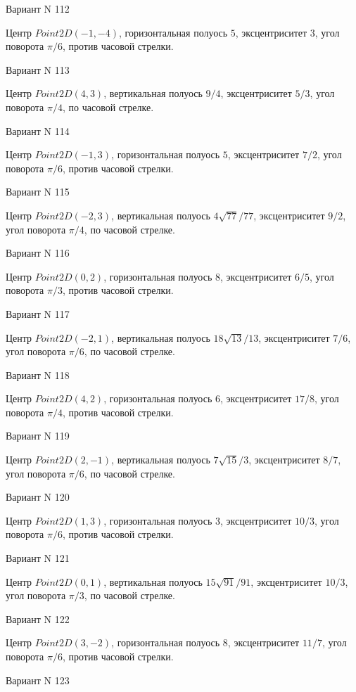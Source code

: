 \documentclass[11pt]{report}
\begin{document}
Вариант N 112

Центр $Point2D\left(-1, -4\right)$, горизонтальная полуось $5$, эксцентриситет $3$, угол поворота $\pi / 6$, против часовой стрелки.

Вариант N 113

Центр $Point2D\left(4, 3\right)$, вертикальная полуось $9 / 4$, эксцентриситет $5 / 3$, угол поворота $\pi / 4$, по часовой стрелке.

Вариант N 114

Центр $Point2D\left(-1, 3\right)$, горизонтальная полуось $5$, эксцентриситет $7 / 2$, угол поворота $\pi / 6$, против часовой стрелки.

Вариант N 115

Центр $Point2D\left(-2, 3\right)$, вертикальная полуось $4 \sqrt{77} / 77$, эксцентриситет $9 / 2$, угол поворота $\pi / 4$, по часовой стрелке.

Вариант N 116

Центр $Point2D\left(0, 2\right)$, горизонтальная полуось $8$, эксцентриситет $6 / 5$, угол поворота $\pi / 3$, против часовой стрелки.

Вариант N 117

Центр $Point2D\left(-2, 1\right)$, вертикальная полуось $18 \sqrt{13} / 13$, эксцентриситет $7 / 6$, угол поворота $\pi / 6$, по часовой стрелке.

Вариант N 118

Центр $Point2D\left(4, 2\right)$, горизонтальная полуось $6$, эксцентриситет $17 / 8$, угол поворота $\pi / 4$, против часовой стрелки.

Вариант N 119

Центр $Point2D\left(2, -1\right)$, вертикальная полуось $7 \sqrt{15} / 3$, эксцентриситет $8 / 7$, угол поворота $\pi / 6$, по часовой стрелке.

Вариант N 120

Центр $Point2D\left(1, 3\right)$, горизонтальная полуось $3$, эксцентриситет $10 / 3$, угол поворота $\pi / 6$, против часовой стрелки.

Вариант N 121

Центр $Point2D\left(0, 1\right)$, вертикальная полуось $15 \sqrt{91} / 91$, эксцентриситет $10 / 3$, угол поворота $\pi / 3$, по часовой стрелке.

Вариант N 122

Центр $Point2D\left(3, -2\right)$, горизонтальная полуось $8$, эксцентриситет $11 / 7$, угол поворота $\pi / 6$, против часовой стрелки.

Вариант N 123
\end{document}
